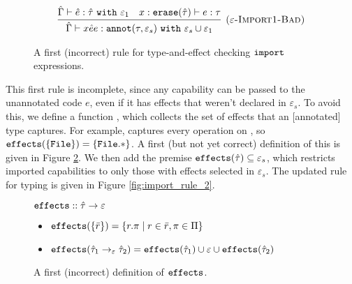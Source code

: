 \begin{figure}[h]
\vspace{-0.5cm}
\[
\begin{array}{c}

\infer[\textsc{($\varepsilon$-Import1-Bad)}]
	{ \hat \Gamma \vdash {x}{\hat e}{e}: \kwa{annot}(\tau, \varepsilon_s)~\kw{with} \varepsilon_s \cup \varepsilon_1 }
	{ \hat \Gamma \vdash \hat e: \hat \tau~\kw{with} \varepsilon_1 & x: \kwa{erase}(\hat \tau) \vdash e: \tau }

\end{array}
\]
\vspace{-0.5cm}
\caption{A first (incorrect) rule for type-and-effect checking $\mathtt{import}$ expressions.}
\vspace{-0.5cm}
\label{fig:import_rule_1}
\end{figure}

This first rule is incomplete, since any capability can be passed to the unannotated
code $e$, even if it has effects that weren't declared in $\varepsilon_s$. To avoid
this, we define a function , which collects the
set of effects that an [annotated] type captures. For example, 
captures every operation on , so $\mathtt{effects}(\{\mathtt{File}\}) = \mathtt{\{File.*\}}$.
A first (but not yet correct) definition of this is given in Figure \ref{fig:fx_defn}.
We then add the premise $\mathtt{effects}(\hat \tau) \subseteq \varepsilon_s$,
which restricts imported capabilities to only those with effects selected in
$\varepsilon_s$. The updated rule for typing  is given in Figure
\ref{fig:import_rule_2}.

\begin{figure}

$\mathtt{effects} :: \hat \tau \rightarrow \varepsilon$
\vspace{-0.2cm}
\begin{itemize}
	\setlength\itemsep{-0.2em}
	\item[] $\mathtt{effects}(\{ \bar r \}) = \{ r.\pi \mid r \in \bar r, \pi \in \Pi \}$
	\item[] $\mathtt{effects}(\hat \tau_1 \rightarrow_{\varepsilon} \hat \tau_2) = \mathtt{effects}(\hat \tau_1) \cup \varepsilon \cup \mathtt{effects}(\hat \tau_2)$
\end{itemize}
\vspace{-0.5cm}
\caption{A first (incorrect) definition of $\mathtt{effects}$.}
\vspace{-0.5cm}
\label{fig:fx_defn}
\end{figure}

